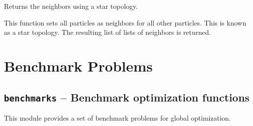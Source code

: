 \documentclass[letterpaper,10pt,english]{sphinxmanual}
\begin{document}

\begin{fulllineitems}
\label{reference:inspyred.swarm.topologies.star_topology}
Returns the neighbors using a star topology.

This function sets all particles as neighbors for all other particles.
This is known as a star topology. The resulting list of lists of 
neighbors is returned.

\end{fulllineitems}



\section{Benchmark Problems}
\label{reference:benchmark-problems}\label{reference:module-inspyred.benchmarks}

\subsection{\texttt{benchmarks} -- Benchmark optimization functions}
\label{reference:benchmarks-benchmark-optimization-functions}
This module provides a set of benchmark problems for global optimization.
\label{reference:module-benchmarks}
\end{document}
